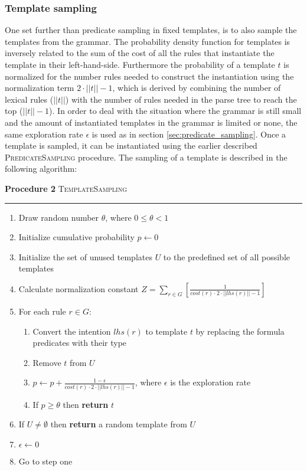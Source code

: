 \documentclass[a4paper]{article}
\begin{document}
\subsubsection{Template sampling}
One set further than predicate sampling in fixed templates, is to also sample the templates from the grammar. The probability density function for templates is inversely related to the sum of the cost of all the rules that instantiate the template in their left-hand-side. Furthermore the probability of a template $t$ is normalized for the number rules needed to construct the instantiation using the normalization term $2 \cdot \left|\left|t\right|\right| - 1$, which is derived by combining the number of lexical rules ($\left|\left|t\right|\right|$) with the number of rules needed in the parse tree to reach the top ($\left|\left|t\right|\right|-1$). In order to deal with the situation where the grammar is still small and the amount of instantiated templates in the grammar is limited or none, the same exploration rate $\epsilon$ is used as in section \ref{sec:predicate_sampling}. Once a template is sampled, it can be instantiated using the earlier described \textsc{PredicateSampling} procedure. The sampling of a template is described in the following algorithm:
\begin{mdframed}
    \textbf{Procedure 2} \textsc{TemplateSampling}\vspace{0.2cm}\hrule\vspace{0.2cm}
\begin{enumerate}
    \item Draw random number $\theta$, where $0 \leq \theta < 1$
    \item Initialize cumulative probability $p \gets 0$
    \item Initialize the set of unused templates $U$ to the predefined set of all possible templates
    \item Calculate normalization constant $Z = \sum_{r \in G} \left[ \frac{1}{cost(r) \cdot 2 \cdot \left|\left|lhs(r)\right|\right| - 1} \right]$
    \item For each rule $r \in G$:
        \begin{enumerate}
            \item Convert the intention $lhs(r)$ to template $t$ by replacing the formula predicates with their type
            \item Remove $t$ from $U$
            \item $p \gets p + \frac{1 - \epsilon}{cost(r) \cdot 2 \cdot \left|\left|lhs(r)\right|\right| - 1}$, where $\epsilon$ is the exploration rate
            \item If $p \geq \theta$ then \textbf{return} $t$
        \end{enumerate}
    \item If $U \neq \emptyset$ then \textbf{return} a random template from $U$
    \item $\epsilon \gets 0$
    \item Go to step one
\end{enumerate}
\end{mdframed}
\end{document}

